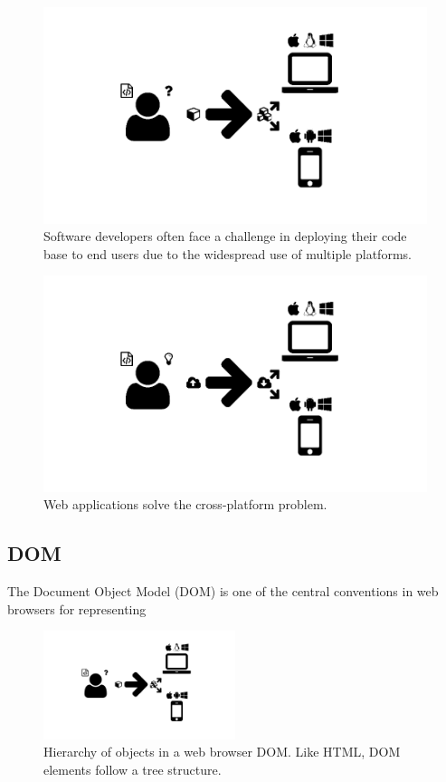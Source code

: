 \begin{figure}
  \centering
  \includegraphics[width=\textwidth,natwidth=610,natheight=642]{images/deployment-problem.png}
  \caption{Software developers often face a challenge in deploying their code base to end users due to the widespread use of multiple platforms.}
  \label{fig:deployment-problem}
\end{figure}
\begin{figure}
  \centering
  \includegraphics[width=\textwidth,natwidth=610,natheight=642]{images/web-app-deployment.png}
  \caption{Web applications solve the cross-platform problem.}
  \label{fig:web-app-deployment}
\end{figure}

\subsection{DOM}

The Document Object Model (DOM) is one of the central conventions in web browsers for representing

\begin{figure}
  \centering
  \includegraphics[width=0.5\textwidth, page=22, trim=0cm 0cm 11cm 0cm, clip=true]{images/Figures.pdf}
  \caption{Hierarchy of objects in a web browser DOM. Like HTML, DOM elements follow a tree structure.}
  \label{Figure:dom}
\end{figure}


